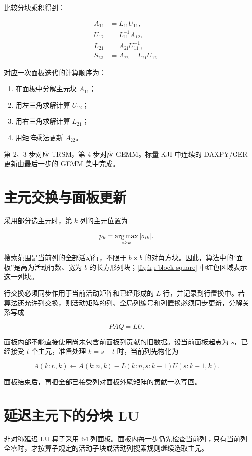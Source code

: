 比较分块乘积得到：

\begin{align}
A_{11}&=L_{11}U_{11},\\
U_{12}&=L_{11}^{-1}A_{12},\\
L_{21}&=A_{21}U_{11}^{-1},\\
S_{22}&=A_{22}-L_{21}U_{12}.
\end{align}

对应一次面板迭代的计算顺序为：

\begin{enumerate}
  \item 在面板中分解主元块 $A_{11}$；
  \item 用左三角求解计算 $U_{12}$；
  \item 用右三角求解计算 $L_{21}$；
  \item 用矩阵乘法更新 $A_{22}$。
\end{enumerate}

第 2、3 步对应 TRSM，第 4 步对应 GEMM。标量 KJI 中连续的 DAXPY/GER 更新由最后一步的 GEMM 集中完成。

\section{主元交换与面板更新}

采用部分选主元时，第 $k$ 列的主元位置为

\[
p_k=\operatorname*{arg\,max}_{i\ge k}|a_{ik}|.
\]

搜索范围是当前列的全部活动行，不限于 $b\times b$ 的对角方块。因此，算法中的“面板”是高为活动行数、宽为 $b$ 的长方形列块；\cref{fig:kji-block-square} 中红色区域表示这一列块。

行交换必须同步作用于当前活动矩阵和已经形成的 $L$ 行，并记录到行置换中。若算法还允许列交换，则活动矩阵的列、全局列编号和列置换必须同步更新，分解关系写成

\[
PAQ=LU.
\]

面板内部不能直接使用尚未包含前面板列贡献的旧数据。设当前面板起点为 $s$，已经接受 $t$ 个主元，准备处理 $k=s+t$ 时，当前列先物化为

\[
A(k:n,k)\leftarrow
A(k:n,k)-L(k:n,s:k-1)U(s:k-1,k).
\]

面板结束后，再把全部已接受列对面板外尾矩阵的贡献一次写回。

\section{延迟主元下的分块 LU}

非对称延迟 LU 算子采用 64 列面板。面板内每一步仍先检查当前列；只有当前列全零时，才按算子规定的活动子块或活动列搜索规则继续选取主元。

